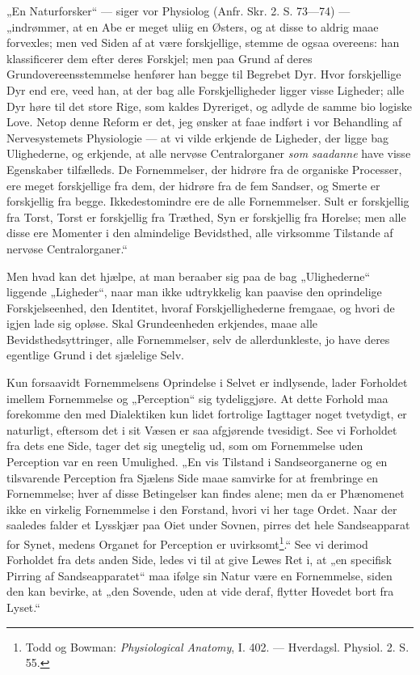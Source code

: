 \documentclass[11pt]{book}
\newcommand{\opage}[1]{\marginnote{\footnotesize\textit{[#1]}}}
\begin{document}
„En Naturforsker“ --- siger vor Physiolog (Anfr. Skr. 2. S. 73---74)
--- „indrømmer, at en Abe er meget uliig en Østers, og at disse to
aldrig maae forvexles; men ved Siden af at være forskjellige, stemme
de ogsaa overeens: han klassificerer dem efter deres Forskjel; men
paa Grund af deres Grundovereensstemmelse henfører han begge til
Begrebet Dyr. Hvor forskjellige Dyr end ere, veed han, at der bag
alle Forskjelligheder ligger visse Ligheder; alle Dyr høre til det
store Rige, som kaldes Dyreriget, og adlyde de samme bio\-%
\opage{371} \setcounter{footnote}{0}%
logiske Love. Netop denne Reform er det, jeg ønsker at faae indført i
vor Behandling af Nervesystemets Physiologie --- at vi vilde
erkjende de Ligheder, der ligge bag Ulighederne, og erkjende, at alle
nervøse Centralorganer \emph{som saadanne} have visse Egenskaber
tilfælleds. De Fornemmelser, der hidrøre fra de organiske Processer,
ere meget forskjellige fra dem, der hidrøre fra de fem Sandser, og
Smerte er forskjellig fra begge. Ikkedestomindre ere de alle
Fornemmelser. Sult er forskjellig fra Torst, Torst er forskjellig fra
Træthed, Syn er forskjellig fra Horelse; men alle disse ere Momenter
i den almindelige Bevidsthed, alle virksomme Tilstande af nervøse
Centralorganer.“

Men hvad kan det hjælpe, at man beraaber sig paa de bag
„Ulighederne“ liggende „Ligheder“, naar man ikke udtrykkelig kan
paavise den oprindelige Forskjelseenhed, den Identitet, hvoraf
Forskjellighederne fremgaae, og hvori de igjen lade sig opløse. Skal
Grundeenheden erkjendes, maae alle Bevidsthedsyttringer, alle
Fornemmelser, selv de allerdunkleste, jo have deres egentlige Grund i
det sjælelige Selv.

Kun forsaavidt Fornemmelsens Oprindelse i Selvet er indlysende,
lader Forholdet imellem Fornemmelse og „Perception“ sig
tydeliggjøre. At dette Forhold maa forekomme den med Dialektiken kun
lidet fortrolige Iagttager noget tvetydigt, er naturligt, eftersom
det i sit Væsen er saa afgjørende tvesidigt. See vi Forholdet fra
dets ene Side, tager det sig unegtelig ud, som om Fornemmelse uden
Perception var en reen Umulighed. „En vis Tilstand i Sandseorganerne
og en tilsvarende Perception fra Sjælens Side maae samvirke for at
frembringe en Fornemmelse; hver af disse Betingelser kan findes
alene; men da er Phænomenet ikke en virkelig Fornemmelse i den
Forstand, hvori vi her tage Ordet. Naar der saaledes falder et
Lysskjær paa Oiet under Sovnen, pirres det hele Sandseapparat for
Synet, medens Organet
\opage{372} \setcounter{footnote}{0}%
for Perception er uvirksomt\footnote{Todd og Bowman: \textit{Physiological
Anatomy}, I. 402. --- Hverdagsl. Physiol. 2. S. 55.}.“ See vi derimod
Forholdet fra dets anden Side, ledes vi til at give Lewes Ret i, at
„en specifisk Pirring af Sandseapparatet“ maa ifølge sin Natur være
en Fornemmelse, siden den kan bevirke, at „den Sovende, uden at vide
deraf, flytter Hovedet bort fra Lyset.“
\end{document}

